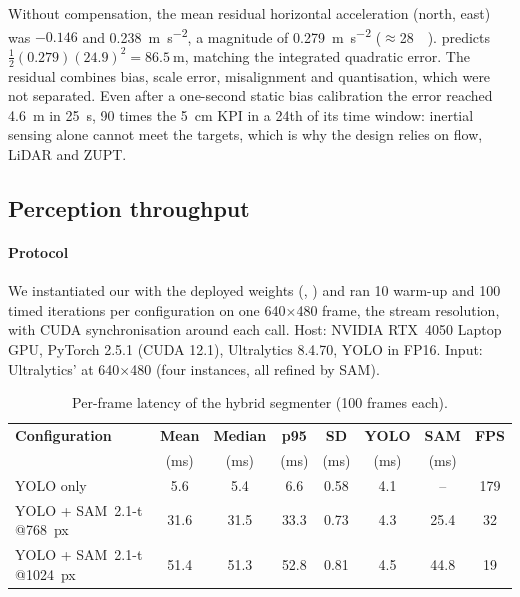 Without compensation, the mean residual horizontal acceleration (north, east) was
$-0.146$ and \SI{0.238}{\metre\per\second\squared}, a magnitude of
\SI{0.279}{\metre\per\second\squared} ($\approx$\SI{28}{\milli\gacc}).  predicts $\tfrac12(0.279)(24.9)^2=\SI{86.5}{\metre}$, matching
the integrated quadratic error. The residual combines bias, scale error, misalignment
and quantisation, which were not separated. Even after a one-second static bias
calibration the error reached \SI{4.6}{\metre} in \SI{25}{\second}, 90 times the
\SI{5}{\centi\metre} KPI in a 24th of its time window: inertial sensing alone cannot
meet the targets, which is why the design relies on flow, LiDAR and ZUPT.

\subsection{Perception throughput}
\label{sec:val-seg}

\paragraph{Protocol} We instantiated our  with the deployed weights
(, ) and ran 10 warm-up and 100 timed
iterations per configuration on one 640$\times$480 frame, the stream resolution, with
CUDA synchronisation around each call. Host: NVIDIA RTX~4050 Laptop GPU, PyTorch 2.5.1
(CUDA 12.1), Ultralytics 8.4.70, YOLO in FP16. Input: Ultralytics'  at 640$\times$480 (four
instances, all refined by SAM).

\begin{table}[H]
\centering\small
\caption{Per-frame latency of the hybrid segmenter (100 frames each).}
\label{tab:seg}
\begin{tabular}{l S[table-format=2.1] S[table-format=2.1] S[table-format=2.1] S[table-format=1.2] S[table-format=2.1] S[table-format=2.1] S[table-format=3.0]}
\toprule
\textbf{Configuration} & {\textbf{Mean}} & {\textbf{Median}} & {\textbf{p95}} & {\textbf{SD}} & {\textbf{YOLO}} & {\textbf{SAM}} & {\textbf{FPS}} \\
 & {(ms)} & {(ms)} & {(ms)} & {(ms)} & {(ms)} & {(ms)} & \\
\midrule
YOLO only & 5.6 & 5.4 & 6.6 & 0.58 & 4.1 & {--} & 179 \\
YOLO + SAM~2.1-t @\SI{768}{px} & 31.6 & 31.5 & 33.3 & 0.73 & 4.3 & 25.4 & 32 \\
YOLO + SAM~2.1-t @\SI{1024}{px} & 51.4 & 51.3 & 52.8 & 0.81 & 4.5 & 44.8 & 19 \\
\bottomrule
\end{tabular}
\end{table}

